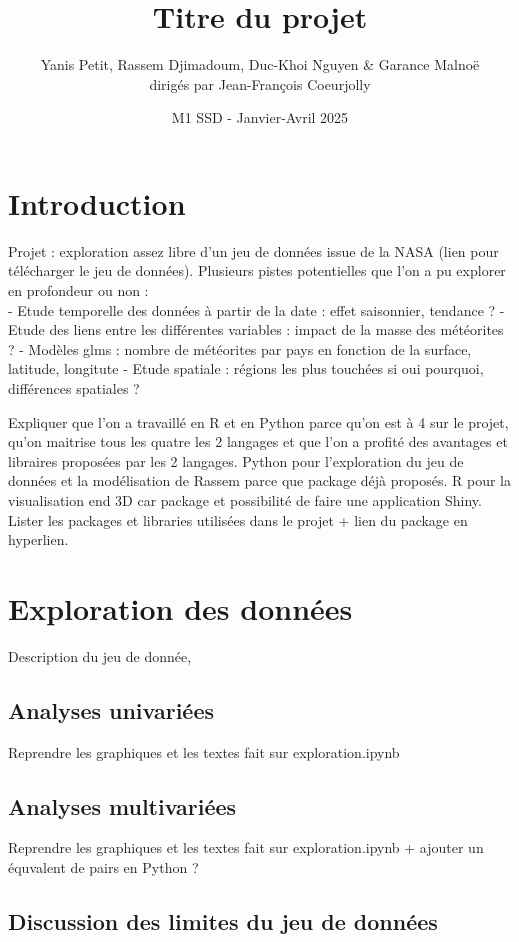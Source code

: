 \documentclass[12pt]{article}
\title{Titre du projet}
\author{Yanis Petit, Rassem Djimadoum, Duc-Khoi Nguyen \& Garance Malnoë \\dirigés par Jean-François Coeurjolly}
\date{M1 SSD - Janvier-Avril 2025}
\begin{document}
\maketitle
\newpage
\tableofcontents
\newpage
\section{Introduction}
Projet :  exploration assez libre d'un jeu de données issue de la NASA (lien pour télécharger le jeu de données).
Plusieurs pistes potentielles que l'on a pu explorer en profondeur ou non :\\
- Etude temporelle des données à partir de la date : effet saisonnier, tendance ?
- Etude des liens entre les différentes variables : impact de la masse des météorites ?
- Modèles glms : nombre de météorites par pays en fonction de la surface, latitude, longitute
- Etude spatiale : régions les plus touchées si oui pourquoi, différences spatiales ?


Expliquer que l'on a travaillé en R et en Python parce qu'on est à 4 sur le projet, qu'on maitrise tous les quatre les 2 langages et que l'on a profité des avantages et libraires proposées par les 2 langages.
Python pour l'exploration du jeu de données et la modélisation de Rassem parce que package déjà proposés.
R pour la visualisation end 3D car package et possibilité de faire une application Shiny.
Lister les packages et libraries utilisées dans le projet + lien du package en hyperlien.


\section{Exploration des données}
Description du jeu de donnée, 

\subsection{Analyses univariées}
Reprendre les graphiques et les textes fait sur exploration.ipynb

\subsection{Analyses multivariées}
Reprendre les graphiques et les textes fait sur exploration.ipynb + ajouter un équvalent de pairs en Python ?

\subsection{Discussion des limites du jeu de données}
\end{document}
